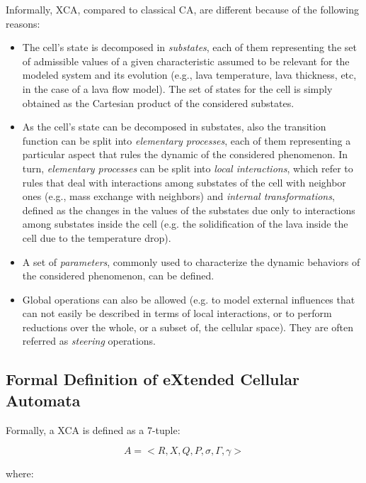Informally, XCA, compared to classical CA, are different because of
the following reasons:

\begin{itemize}

\item The cell's state is decomposed in \emph{substates}, each of them
  representing the set of admissible values of a given characteristic
  assumed to be relevant for the modeled system and its evolution
  (e.g., lava temperature, lava thickness, etc, in the case of a lava
  flow model). The set of states for the cell is simply obtained as
  the Cartesian product of the considered substates.

\item As the cell's state can be decomposed in substates, also the
  transition function can be split into \emph{elementary processes},
  each of them representing a particular aspect that rules the dynamic
  of the considered phenomenon. In turn, \emph{elementary processes}
  can be split into \emph{local interactions}, which refer to rules
  that deal with interactions among substates of the cell with
  neighbor ones (e.g., mass exchange with neighbors) and
  \emph{internal transformations}, defined as the changes in the
  values of the substates due only to interactions among substates
  inside the cell (e.g. the solidification of the lava inside the cell
  due to the temperature drop).

\item A set of \emph{parameters}, commonly used to characterize the
  dynamic behaviors of the considered phenomenon, can be defined.

\item Global operations can also be allowed (e.g. to model external
  influences that can not easily be described in terms of local
  interactions, or to perform reductions over the whole, or a subset
  of, the cellular space). They are often referred as \emph{steering}
  operations.

\end{itemize}


\subsection{Formal Definition of eXtended Cellular Automata}


Formally, a XCA is defined as a 7-tuple:

$$ A = <R,X,Q,P,\sigma,\Gamma,\gamma>$$

\noindent where:

